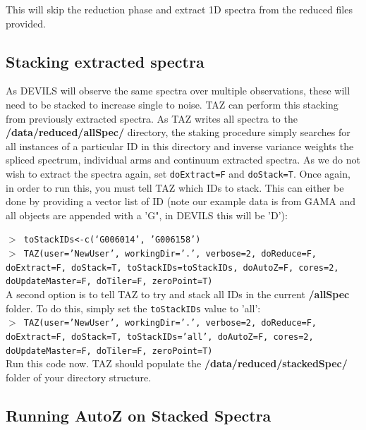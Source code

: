 \documentclass[12pt]{article}
\begin{document}
 This will skip the reduction phase and extract 1D spectra from the reduced files provided.
 
 \subsection{Stacking extracted spectra}
 
 As DEVILS will observe the same spectra over multiple observations, these will need to be stacked to increase single to noise. TAZ can perform this stacking from previously extracted spectra. As TAZ writes all spectra to the \textbf{/data/reduced/allSpec/} directory, the staking procedure simply searches for all instances of a particular ID in this directory and inverse variance weights the spliced spectrum, individual arms and continuum extracted spectra. As we do not wish to extract the spectra again, set \texttt{doExtract=F} and \texttt{doStack=T}. Once again, in order to run this, you must tell TAZ which IDs to stack. This can either be done by providing a vector list of ID (note our example data is from GAMA and all objects are appended with a 'G", in DEVILS this will be 'D'):
 
   \hspace{10mm} \texttt{$>$ toStackIDs<-c(`G006014', 'G006158')}\\
 
  \hspace{10mm} \texttt{$>$ TAZ(user='NewUser', workingDir='.', verbose=2, doReduce=F, doExtract=F, doStack=T,  toStackIDs=toStackIDs, doAutoZ=F, cores=2, doUpdateMaster=F, doTiler=F, zeroPoint=T)}\\ 
  
  A second option is to tell TAZ to try and stack all IDs in the current \textbf{/allSpec} folder. To do this, simply set the \texttt{toStackIDs} value to 'all': \\
  

  \hspace{10mm} \texttt{$>$ TAZ(user='NewUser', workingDir='.', verbose=2, doReduce=F, doExtract=F, doStack=T,  toStackIDs='all', doAutoZ=F, cores=2, doUpdateMaster=F, doTiler=F, zeroPoint=T)}\\   

Run this code now. TAZ should populate the \textbf{/data/reduced/stackedSpec/} folder of your directory structure. 


 \subsection{Running AutoZ on Stacked Spectra}
\end{document}
